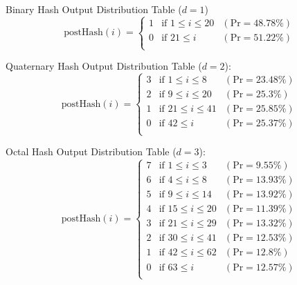 Binary Hash Output Distribution Table (\(d=1\))
{\renewcommand{\arraystretch}{1.25}
\[
\text{postHash}(i) = \left\{
    \begin{array}{lll}
        \text{1}  & \text{if } 1 \leq i \leq 20 & (\text{Pr} = 48.78\%)
        \\
        \text{0}  & \text{if } 21 \leq i & (\text{Pr} = 51.22\%)
        \\
    \end{array}
\right.    
\]}


Quaternary Hash Output Distribution Table (\(d=2\)):
{\renewcommand{\arraystretch}{1.25}
\[
\text{postHash}(i) = \left\{
    \begin{array}{lll}
        \text{3}  & \text{if } 1 \leq i \leq 8 & (\text{Pr} = 23.48\%)
        \\
        \text{2}  & \text{if } 9 \leq i \leq 20 & (\text{Pr} = 25.3\%)
        \\
        \text{1}  & \text{if } 21 \leq i \leq 41 & (\text{Pr} = 25.85\%)
        \\
        \text{0}  & \text{if } 42 \leq i & (\text{Pr} = 25.37\%)
        \\
    \end{array}
\right.    
\]}

Octal Hash Output Distribution Table (\(d=3\)):
{\renewcommand{\arraystretch}{1.25}
\[
\text{postHash}(i) = \left\{
    \begin{array}{lll}
        \text{7}  & \text{if } 1 \leq i \leq 3 & (\text{Pr} = 9.55\%)
        \\
        \text{6}  & \text{if } 4 \leq i \leq 8 & (\text{Pr} = 13.93\%)
        \\
        \text{5}  & \text{if } 9 \leq i \leq 14 & (\text{Pr} = 13.92\%)
        \\
        \text{4}  & \text{if } 15 \leq i \leq 20 & (\text{Pr} = 11.39\%)
        \\
        \text{3}  & \text{if } 21 \leq i \leq 29 & (\text{Pr} = 13.32\%)
        \\
        \text{2}  & \text{if } 30 \leq i \leq 41 & (\text{Pr} = 12.53\%)
        \\
        \text{1}  & \text{if } 42 \leq i \leq 62 & (\text{Pr} = 12.8\%)
        \\
        \text{0}  & \text{if } 63 \leq i & (\text{Pr} = 12.57\%)
        \\
    \end{array}
\right.    
\]}


